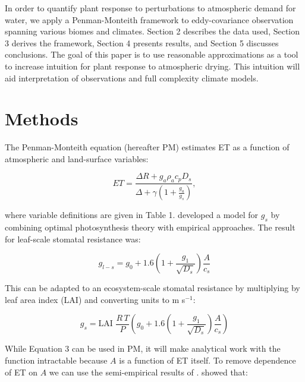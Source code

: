 \documentclass[draft,linenumbers]{agujournal}
\begin{document}
In order to quantify plant response to perturbations to atmospheric demand for water, we apply a Penman-Monteith framework to eddy-covariance observation spanning various biomes and climates. Section 2 describes the data used, Section 3 derives the framework, Section 4 presents results, and Section 5 discusses conclusions. The goal of this paper is to use reasonable approximations as a tool to increase intuition for plant response to atmospheric drying. This intuition will aid interpretation of observations and full complexity climate models.

\section{Methods}

The Penman-Monteith equation (hereafter PM) estimates ET as a function of atmospheric and land-surface variables:

\begin{linenomath*}
  \begin{equation}
      ET = \frac{\Delta R + g_a \rho_a c_p D_{s}}{\Delta + \gamma(1 + \frac{g_a}{g_s})},
  \end{equation}
\end{linenomath*}

 where variable definitions are given in Table 1. \citet{MEDLYN_2011} developed a model for $g_s$ by combining optimal photosynthesis theory with empirical approaches. The result for leaf-scale stomatal resistance was:

\begin{linenomath*}
  \begin{equation}
  g_{l-s} = g_0 + 1.6 \left(1 + \frac{g_1}{\sqrt{D_{s}}}\right) \frac{A}{c_s}
  \end{equation}
\end{linenomath*}

This can be adapted to an ecosystem-scale stomatal resistance by multiplying by leaf area index (LAI) and converting units to m s$^{-1}$:
\begin{linenomath*}
  \label{medlyn}
  \begin{equation}
  g_s = \text{LAI } \frac{R \,T}{P} \left( g_0 + 1.6 \left(1 + \frac{g_1}{\sqrt{D_{s}}}\right) \frac{A}{c_s}\right)
  \end{equation}
\end{linenomath*}

While Equation 3 can be used in PM, it will make analytical work with the function intractable because $A$ is a function of ET itself. To remove dependence of ET on $A$ we can use the semi-empirical results of \citet{Zhou_2015}. \citet{Zhou_2015} showed that:
\end{document}
